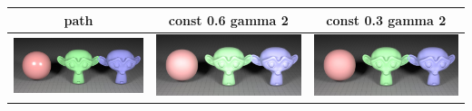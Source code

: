 \documentclass[11pt]{article}
\begin{document}
\begin{table}[ht]
  \centering
  \begin{tabular}{ | c | c | c |}
    \hline
    path & const 0.6 gamma 2 & const 0.3 gamma 2 \\ \hline
    \begin{minipage}{.3\textwidth}
      \includegraphics[scale=0.1]{img/obj/subdiv_al/subdiv_al.jpg}
    \end{minipage}
    &
    \begin{minipage}{.3\textwidth}
      \includegraphics[scale=0.1]{img/obj/subdiv_al/subdiv_al_disney.jpg}
    \end{minipage}
    & 
    \begin{minipage}{.3\textwidth}
      \includegraphics[scale=0.1]{img/obj/subdiv_al/subdiv_al_disney_dc03.jpg}
    \end{minipage}
    \\ \hline
  \end{tabular}
\end{table}
\end{document}
